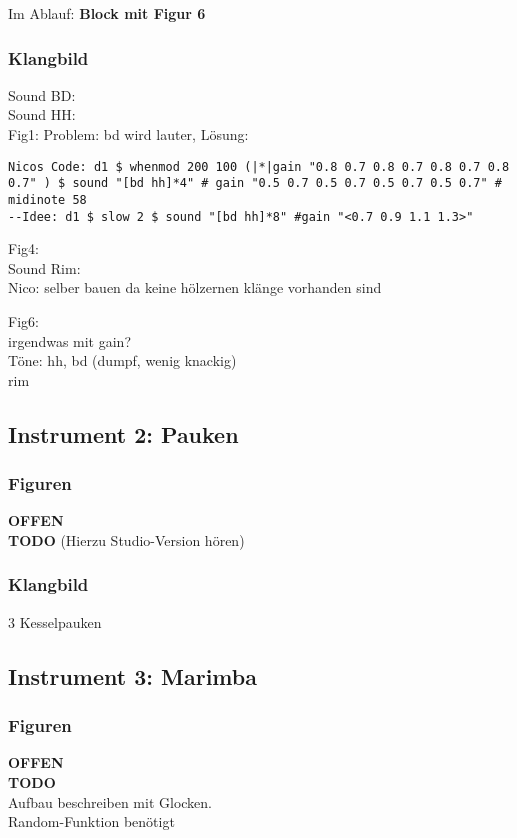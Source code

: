 \documentclass[
10pt, %
a4paper, %
oneside, %
headinclude,footinclude, %
BCOR5mm, %
]{scrartcl}
\begin{document}
\noindent Im Ablauf: \textbf{Block mit Figur 6}

\subsubsection{Klangbild}
Sound BD:\\
Sound HH:\\

Fig1: Problem: bd wird lauter, Lösung:\\
\begin{lstlisting}
Nicos Code: d1 $ whenmod 200 100 (|*|gain "0.8 0.7 0.8 0.7 0.8 0.7 0.8 0.7" ) $ sound "[bd hh]*4" # gain "0.5 0.7 0.5 0.7 0.5 0.7 0.5 0.7" # midinote 58
--Idee: d1 $ slow 2 $ sound "[bd hh]*8" #gain "<0.7 0.9 1.1 1.3>"
\end{lstlisting}

Fig4:\\
Sound Rim:\\
Nico: selber bauen da keine hölzernen klänge vorhanden sind

Fig6:\\
irgendwas mit gain?\\



Töne: hh, bd (dumpf, wenig knackig)\\
rim

\subsection{Instrument 2: Pauken}
\subsubsection{Figuren}
{\color{red}\textbf{OFFEN}} \\
{\color{red}\textbf{TODO}}
(Hierzu Studio-Version hören)\\

\subsubsection{Klangbild}
3 Kesselpauken

\subsection{Instrument 3: Marimba}
\subsubsection{Figuren}
{\color{red}\textbf{OFFEN}} \\
{\color{red}\textbf{TODO}}\\
Aufbau beschreiben mit Glocken.\\
Random-Funktion benötigt
\end{document}
